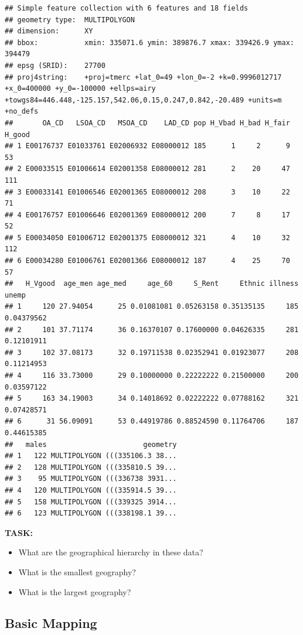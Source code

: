 \documentclass[]{book}
\providecommand{\tightlist}{%
  \setlength{\itemsep}{0pt}\setlength{\parskip}{0pt}}
\begin{document}
\begin{verbatim}
## Simple feature collection with 6 features and 18 fields
## geometry type:  MULTIPOLYGON
## dimension:      XY
## bbox:           xmin: 335071.6 ymin: 389876.7 xmax: 339426.9 ymax: 394479
## epsg (SRID):    27700
## proj4string:    +proj=tmerc +lat_0=49 +lon_0=-2 +k=0.9996012717 +x_0=400000 +y_0=-100000 +ellps=airy +towgs84=446.448,-125.157,542.06,0.15,0.247,0.842,-20.489 +units=m +no_defs
##       OA_CD   LSOA_CD   MSOA_CD    LAD_CD pop H_Vbad H_bad H_fair H_good
## 1 E00176737 E01033761 E02006932 E08000012 185      1     2      9     53
## 2 E00033515 E01006614 E02001358 E08000012 281      2    20     47    111
## 3 E00033141 E01006546 E02001365 E08000012 208      3    10     22     71
## 4 E00176757 E01006646 E02001369 E08000012 200      7     8     17     52
## 5 E00034050 E01006712 E02001375 E08000012 321      4    10     32    112
## 6 E00034280 E01006761 E02001366 E08000012 187      4    25     70     57
##   H_Vgood  age_men age_med     age_60     S_Rent     Ethnic illness      unemp
## 1     120 27.94054      25 0.01081081 0.05263158 0.35135135     185 0.04379562
## 2     101 37.71174      36 0.16370107 0.17600000 0.04626335     281 0.12101911
## 3     102 37.08173      32 0.19711538 0.02352941 0.01923077     208 0.11214953
## 4     116 33.73000      29 0.10000000 0.22222222 0.21500000     200 0.03597122
## 5     163 34.19003      34 0.14018692 0.02222222 0.07788162     321 0.07428571
## 6      31 56.09091      53 0.44919786 0.88524590 0.11764706     187 0.44615385
##   males                       geometry
## 1   122 MULTIPOLYGON (((335106.3 38...
## 2   128 MULTIPOLYGON (((335810.5 39...
## 3    95 MULTIPOLYGON (((336738 3931...
## 4   120 MULTIPOLYGON (((335914.5 39...
## 5   158 MULTIPOLYGON (((339325 3914...
## 6   123 MULTIPOLYGON (((338198.1 39...
\end{verbatim}

\textbf{TASK:}

\begin{itemize}
\tightlist
\item
  What are the geographical hierarchy in these data?
\item
  What is the smallest geography?
\item
  What is the largest geography?
\end{itemize}

\subsection{Basic Mapping}\label{basic-mapping}
\end{document}
